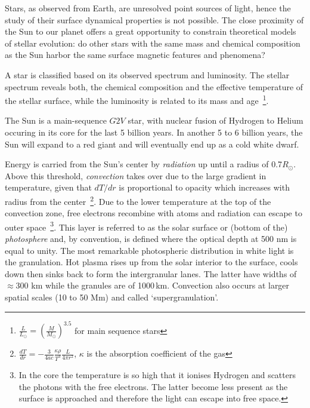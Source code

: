 \documentclass[goettingen, gauss, print]{thesis}
\begin{document}

Stars, as observed from Earth, are unresolved point sources of light, hence the study of their surface dynamical properties is not possible.
The close proximity of the Sun to our planet offers a great opportunity to constrain theoretical models of stellar evolution: do other stars with the same mass and chemical composition as the Sun harbor the same surface magnetic features and phenomena?

A star is classified based on its observed spectrum and luminosity. The stellar spectrum reveals both, the chemical composition and the effective temperature of the stellar surface, while the luminosity is related to its mass and age~\footnote{ $\frac{L}{L_{\odot}} = (\frac{M}{M_{\odot}})^{3.5}$ for main sequence stars }.

The Sun is a main-sequence $G2V$ star, with nuclear fusion of Hydrogen to Helium occuring in its core for the last 5 billion years. In another 5 to 6 billion years, the Sun will expand to a red giant and will eventually end up as a cold white dwarf. 

Energy is carried from the Sun's center by \textit{radiation} up until a radius of 0.7$R_{\odot}$. Above this threshold, \textit{convection} takes over due to the large gradient in temperature, given that $dT/dr$ is proportional to opacity which increases with radius from the center~\footnote{$\frac{dT}{dr} = -\frac{3}{4ac}\frac{\kappa \rho}{T^3}\frac{L}{4\pi r^2}$, $\kappa$ is the absorption coefficient of the gas}. 
Due to the lower temperature at the top of the convection zone, free electrons recombine with atoms and radiation can escape to outer space~\footnote{In the core the temperature is so high that it ionises Hydrogen and scatters the photons with the free electrons. The latter become less present as the surface is approached and therefore the light can escape into free space.}. This layer is referred to as the solar surface or (bottom of the) \textit{photosphere} and, by convention, is defined where the optical depth at 500 nm is equal to unity. The most remarkable photospheric distribution in white light is the granulation. Hot plasma rises up from the solar interior to the surface, cools down then sinks back to form the intergranular lanes. The latter have widths of $\approx$300 km while the granules are of 1000\,km.
Convection also occurs at larger spatial scales (10 to 50 Mm) and called `supergranulation'.
\end{document}
